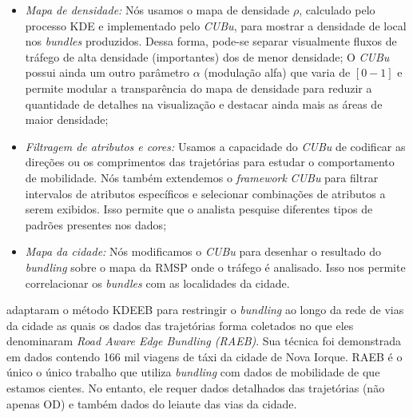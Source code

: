 \begin{itemize}
\item\emph{Mapa de densidade:} Nós usamos o mapa de densidade $\rho$,
calculado pelo processo KDE e implementado pelo \emph{CUBu}, para mostrar a densidade de
local nos \emph{bundles} produzidos. Dessa forma, pode-se separar visualmente
fluxos de tráfego de alta densidade (importantes) dos de menor densidade; O \emph{CUBu}
possui ainda um outro parâmetro $\alpha$ (modulação alfa) que varia de $[0 - 1]$
e permite modular a transparência do mapa de densidade para reduzir a quantidade de detalhes
na visualização e destacar ainda mais as áreas de maior densidade;
 
\item\emph{Filtragem de atributos e cores:} Usamos a capacidade do \emph{CUBu} de
codificar as direções ou os comprimentos das trajetórias para
estudar o comportamento de mobilidade. Nós também extendemos o \emph{framework} \emph{CUBu}
para filtrar intervalos de atributos específicos e selecionar combinações de atributos a
serem exibidos. Isso permite que o analista pesquise diferentes tipos de padrões
presentes nos dados;

\item\emph{Mapa da cidade:} Nós modificamos o \emph{CUBu} para desenhar
o resultado do \emph{bundling} sobre o mapa da RMSP onde o tráfego é analisado. Isso nos permite
correlacionar os \emph{bundles} com as localidades da cidade.
\end{itemize}


\cite{zeng:19} adaptaram o método KDEEB para restringir o \emph{bundling}
ao longo da rede de vias da cidade as quais os dados das trajetórias forma
coletados no que eles denominaram \emph{Road Aware Edge
Bundling (RAEB)}. Sua técnica foi demonstrada em dados contendo
166 mil viagens de táxi da cidade de Nova Iorque. RAEB é o único o único
trabalho que utiliza \emph{bundling} com dados de mobilidade de que estamos cientes.
No entanto, ele requer dados detalhados das trajetórias (não apenas OD) e também
dados do leiaute das vias da cidade.

